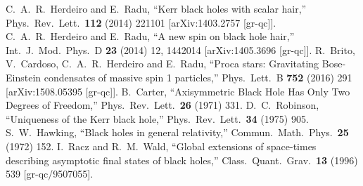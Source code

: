 \begin{small}
\begin{thebibliography}{99}

  C.~A.~R.~Herdeiro and E.~Radu,
  ``Kerr black holes with scalar hair,''
  Phys.\ Rev.\ Lett.\  {\bf 112} (2014) 221101
  [arXiv:1403.2757 [gr-qc]].
  C.~A.~R.~Herdeiro and E.~Radu,
  ``A new spin on black hole hair,''
  Int.\ J.\ Mod.\ Phys.\ D {\bf 23} (2014) 12,  1442014
  [arXiv:1405.3696 [gr-qc]].
  R.~Brito, V.~Cardoso, C.~A.~R.~Herdeiro and E.~Radu,
  ``Proca stars: Gravitating Bose-Einstein condensates of massive spin 1 particles,''
  Phys.\ Lett.\ B {\bf 752} (2016) 291
  [arXiv:1508.05395 [gr-qc]].
  B.~Carter,
  ``Axisymmetric Black Hole Has Only Two Degrees of Freedom,''
  Phys.\ Rev.\ Lett.\  {\bf 26} (1971) 331.
  D.~C.~Robinson,
  ``Uniqueness of the Kerr black hole,''
  Phys.\ Rev.\ Lett.\  {\bf 34} (1975) 905.
  S.~W.~Hawking,
  ``Black holes in general relativity,''
  Commun.\ Math.\ Phys.\  {\bf 25} (1972) 152.
  I.~Racz and R.~M.~Wald,
  ``Global extensions of space-times describing asymptotic final states of black holes,''
  Class.\ Quant.\ Grav.\  {\bf 13} (1996) 539
  [gr-qc/9507055].


\end{thebibliography}
\end{small}
